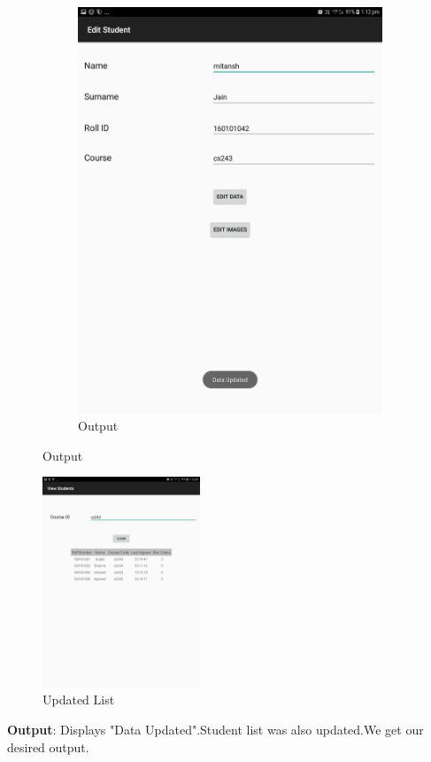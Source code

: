 \documentclass{scrreprt}
\begin{document}
\begin{itemize}
\begin{enumerate}
\begin{figure}[H]
\begin{subfigure}{0.5\textwidth}
\includegraphics[width=0.85\linewidth, keepaspectratio]{editdone.jpg}
\caption{Output}
\label{fig:subim2}
\end{subfigure}
\end{figure}
\begin{figure}[H]
\centering
\includegraphics[width=0.42\textwidth, keepaspectratio]{editafter.jpg}
\caption{Updated List}
\end{figure}
\textbf{Output}: Displays "Data Updated".Student list was also updated.We get our desired output.

\end{enumerate}
\end{itemize}
\end{document}
